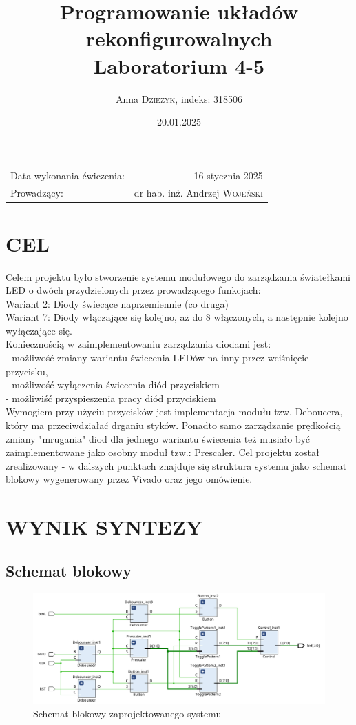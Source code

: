 \documentclass{article}
\title{Programowanie układów rekonfigurowalnych \\ Laboratorium 4-5 \\} %
\author{Anna \textsc{Dzieżyk}, indeks: 318506}%
\date{20.01.2025} %
\begin{document}
\maketitle %

\begin{center}
	\begin{tabular}{l r}
		Data wykonania ćwiczenia: & 16 stycznia 2025 \\ %
		Prowadzący: & dr hab. inż. Andrzej \textsc{Wojeński} %
	\end{tabular}
\end{center}

\section{CEL}
Celem projektu było stworzenie systemu modułowego do zarządzania światełkami LED o dwóch przydzielonych
przez prowadzącego funkcjach: \\
Wariant 2: Diody świecące naprzemiennie (co druga)\\
Wariant 7: Diody włączające się kolejno, aż do 8 włączonych, a następnie kolejno wyłączające się.\\
Koniecznością w zaimplementowaniu zarządzania diodami jest:\\
- możliwość zmiany wariantu świecenia LEDów na inny przez wciśnięcie przycisku, \\
- możliwość wyłączenia świecenia diód przyciskiem \\
- możliwiść przyspieszenia pracy diód przyciskiem \\
Wymogiem przy użyciu przycisków jest implementacja modułu tzw. Deboucera, który ma przeciwdziałać drganiu styków. Ponadto samo 
zarządzanie prędkością zmiany "mrugania" diod dla jednego wariantu świecenia też musiało być zaimplementowane jako osobny moduł tzw.: Prescaler.
Cel projektu został zrealizowany - w dalszych punktach znajduje się struktura systemu jako schemat blokowy wygenerowany przez Vivado oraz jego omówienie.
\section{WYNIK SYNTEZY}
\subsection{Schemat blokowy}
\begin{figure} [H]
	\begin{center}
			\includegraphics[width = \textwidth]{schematBlokowy.png}
			\caption{Schemat blokowy zaprojektowanego systemu}
\end{center}
\end{figure}
\end{document}
